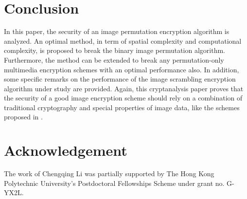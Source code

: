 \documentclass[3p,preprint,11pt]{elsarticle}
\begin{document}
\section{Conclusion}

In this paper, the security of an image permutation encryption
algorithm is analyzed. An optimal method, in term of spatial
complexity and computational complexity, is proposed to break the
binary image permutation algorithm. Furthermore, the method can be
extended to break any permutation-only multimedia encryption schemes
with an optimal performance also. In addition, some specific remarks
on the performance of the image scrambling encryption algorithm
under study are provided. Again, this cryptanalysis paper proves that
the security of a good image encryption scheme should rely on a
combination of traditional cryptography and special properties of
image data, like the schemes proposed in
\cite{Cheng:PartialImageEncryption:IEEETSP2000,Chang:VQImageEncryption:JSS2001}.

\section*{Acknowledgement}

The work of Chengqing Li was partially supported by The Hong Kong Polytechnic
University's Postdoctoral Fellowships Scheme under grant no. G-YX2L.



\end{document}
